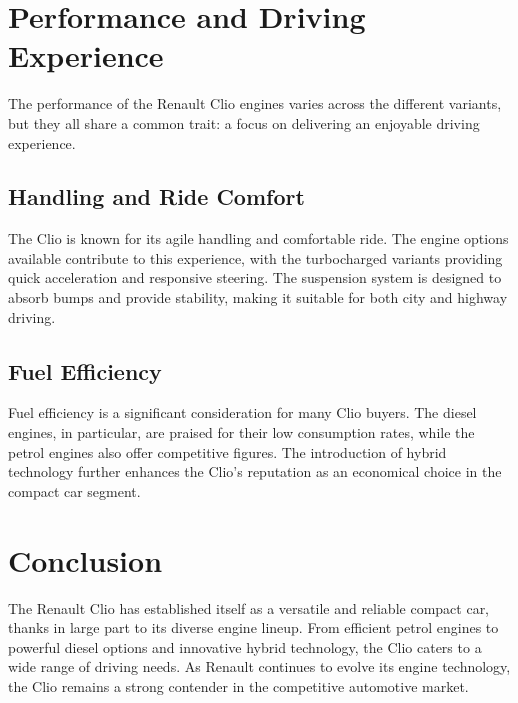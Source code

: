 \documentclass{article}
\begin{document}
\section{Performance and Driving Experience}
The performance of the Renault Clio engines varies across the different variants, but they all share a common trait: a focus on delivering an enjoyable driving experience.

\subsection{Handling and Ride Comfort}
The Clio is known for its agile handling and comfortable ride. The engine options available contribute to this experience, with the turbocharged variants providing quick acceleration and responsive steering. The suspension system is designed to absorb bumps and provide stability, making it suitable for both city and highway driving.

\subsection{Fuel Efficiency}
Fuel efficiency is a significant consideration for many Clio buyers. The diesel engines, in particular, are praised for their low consumption rates, while the petrol engines also offer competitive figures. The introduction of hybrid technology further enhances the Clio's reputation as an economical choice in the compact car segment.

\section{Conclusion}
The Renault Clio has established itself as a versatile and reliable compact car, thanks in large part to its diverse engine lineup. From efficient petrol engines to powerful diesel options and innovative hybrid technology, the Clio caters to a wide range of driving needs. As Renault continues to evolve its engine technology, the Clio remains a strong contender in the competitive automotive market.
\end{document}

